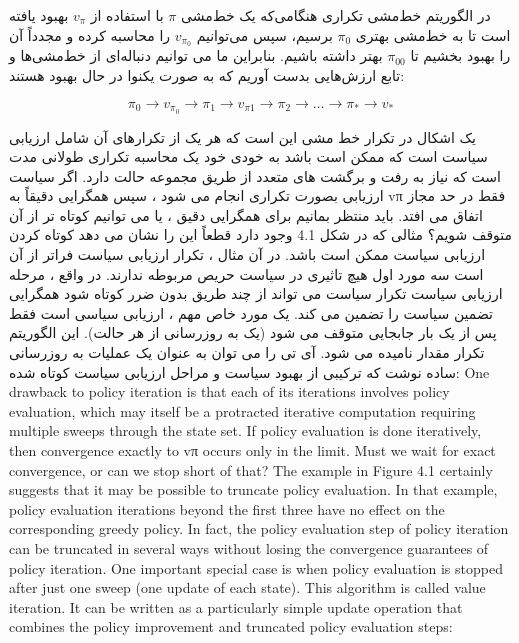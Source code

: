 در الگوریتم خط‌مشی تکراری  هنگامی‌که یک خط‌مشی
$\pi$
 با استفاده از 
$v_{\pi}$
  بهبود یافته است تا به خط‌مشی بهتری
$\pi_0$
    برسیم، سپس می‌توانیم
$v_{\pi_0}$
    را محاسبه کرده و مجدداً آن را بهبود بخشیم تا
$\pi_{00}$
بهتر داشته باشیم.
بنابراین ما می توانیم دنباله‌ای از خط‌مشی‌ها و تابع ارزش‌هایی بدست آوریم که به صورت یکنوا در حال بهبود هستند:
%

$$\pi_0 \longrightarrow v_{\pi_0} \longrightarrow \pi_1 \longrightarrow v_{\pi{1}} \longrightarrow \pi_2 \longrightarrow \dots \longrightarrow \pi_* \longrightarrow v_*$$

یک اشکال در تکرار خط مشی این است که هر یک از تکرارهای آن شامل ارزیابی سیاست است که ممکن است باشد
به خودی خود یک محاسبه تکراری طولانی مدت است که نیاز به رفت و برگشت های متعدد از طریق مجموعه حالت دارد. اگر سیاست
ارزیابی بصورت تکراری انجام می شود ، سپس همگرایی دقیقاً به vπ فقط در حد مجاز اتفاق می افتد. باید منتظر بمانیم
برای همگرایی دقیق ، یا می توانیم کوتاه تر از آن متوقف شویم؟ مثالی که در شکل 4.1 وجود دارد قطعاً این را نشان می دهد
کوتاه کردن ارزیابی سیاست ممکن است باشد. در آن مثال ، تکرار ارزیابی سیاست فراتر از آن است
سه مورد اول هیچ تاثیری در سیاست حریص مربوطه ندارند.
در واقع ، مرحله ارزیابی سیاست تکرار سیاست می تواند از چند طریق بدون ضرر کوتاه شود
همگرایی تضمین سیاست را تضمین می کند. یک مورد خاص مهم ، ارزیابی سیاسی است
فقط پس از یک بار جابجایی متوقف می شود (یک به روزرسانی از هر حالت). این الگوریتم تکرار مقدار نامیده می شود. آی تی
را می توان به عنوان یک عملیات به روزرسانی ساده نوشت که ترکیبی از بهبود سیاست و
مراحل ارزیابی سیاست کوتاه شده:
One drawback to policy iteration is that each of its iterations involves policy evaluation, which may
itself be a protracted iterative computation requiring multiple sweeps through the state set. If policy
evaluation is done iteratively, then convergence exactly to vπ occurs only in the limit. Must we wait
for exact convergence, or can we stop short of that? The example in Figure 4.1 certainly suggests that
it may be possible to truncate policy evaluation. In that example, policy evaluation iterations beyond
the first three have no effect on the corresponding greedy policy.
In fact, the policy evaluation step of policy iteration can be truncated in several ways without losing
the convergence guarantees of policy iteration. One important special case is when policy evaluation
is stopped after just one sweep (one update of each state). This algorithm is called value iteration. It
can be written as a particularly simple update operation that combines the policy improvement and
truncated policy evaluation steps:



